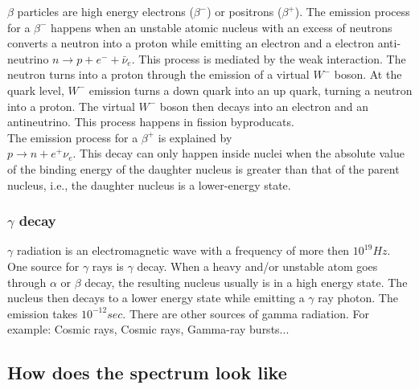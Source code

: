\documentclass[]{article}
\begin{document}
$\beta$ particles are high energy electrons ($\beta^-$) or positrons ($\beta^+$). 
The emission process for a $\beta^-$ happens when an unstable atomic nucleus with an excess of neutrons converts a neutron into a proton while emitting an electron and a electron anti-neutrino $n\rightarrow p+e^-+\bar{\nu}_e$. This process is mediated by the weak interaction. The neutron turns into a proton through the emission of a virtual $W^-$ boson. At the quark level, $W^-$ emission turns a down quark into an up quark, turning a neutron into a proton. The virtual $W^-$ boson then decays into an electron and an antineutrino. This process happens in fission byproducats.\\
The emission process for a $\beta^+$ is explained by\\
$p\rightarrow n+e^+\nu_e$. This decay can only happen inside nuclei when the absolute value of the binding energy of the daughter nucleus is greater than that of the parent nucleus, i.e., the daughter nucleus is a lower-energy state.

\subsubsection{$\gamma$ decay}

$\gamma$ radiation is an electromagnetic wave with a frequency of more then $10^{19}Hz$.
One source for $\gamma$ rays is $\gamma$ decay. When a heavy and/or unstable atom goes through $\alpha$ or $\beta$ decay, the resulting nucleus usually is in a high energy state. The nucleus then decays to a lower energy state while emitting a $\gamma$ ray photon. The emission takes $10^{-12}sec$.
There are other sources of gamma radiation. For example: Cosmic rays, Cosmic rays, Gamma-ray bursts...

\subsection{How does the spectrum look like}
\end{document}
